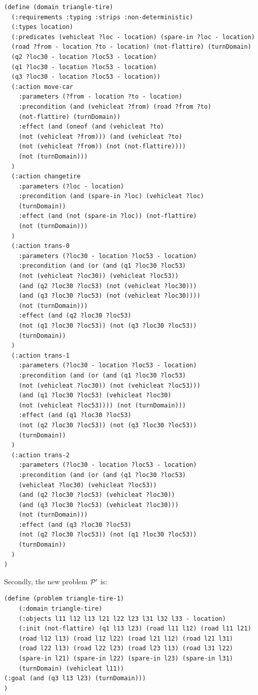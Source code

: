\begin{lstlisting}[language=PDDL, escapechar=£]
(define (domain triangle-tire)
  (:requirements :typing :strips :non-deterministic)
  (:types location)
  (:predicates (vehicleat ?loc - location) (spare-in ?loc - location) 
  (road ?from - location ?to - location) (not-flattire) (turnDomain) 
  (q2 ?loc30 - location ?loc53 - location) 
  (q1 ?loc30 - location ?loc53 - location) 
  (q3 ?loc30 - location ?loc53 - location))
  (:action move-car
    :parameters (?from - location ?to - location)
    :precondition (and (vehicleat ?from) (road ?from ?to) 
    (not-flattire) (turnDomain))
    :effect (and (oneof (and (vehicleat ?to) 
    (not (vehicleat ?from))) (and (vehicleat ?to) 
    (not (vehicleat ?from)) (not (not-flattire)))) 
    (not (turnDomain)))
  )
  (:action changetire
    :parameters (?loc - location)
    :precondition (and (spare-in ?loc) (vehicleat ?loc) 
    (turnDomain))
    :effect (and (not (spare-in ?loc)) (not-flattire) 
    (not (turnDomain)))
  )
  (:action trans-0
    :parameters (?loc30 - location ?loc53 - location)
    :precondition (and (or (and (q1 ?loc30 ?loc53) 
    (not (vehicleat ?loc30)) (vehicleat ?loc53)) 
    (and (q2 ?loc30 ?loc53) (not (vehicleat ?loc30))) 
    (and (q3 ?loc30 ?loc53) (not (vehicleat ?loc30)))) 
    (not (turnDomain)))
    :effect (and (q2 ?loc30 ?loc53) 
    (not (q1 ?loc30 ?loc53)) (not (q3 ?loc30 ?loc53)) 
    (turnDomain))
  )
  (:action trans-1
    :parameters (?loc30 - location ?loc53 - location)
    :precondition (and (or (and (q1 ?loc30 ?loc53) 
    (not (vehicleat ?loc30)) (not (vehicleat ?loc53))) 
    (and (q1 ?loc30 ?loc53) (vehicleat ?loc30) 
    (not (vehicleat ?loc53)))) (not (turnDomain)))
    :effect (and (q1 ?loc30 ?loc53) 
    (not (q2 ?loc30 ?loc53)) (not (q3 ?loc30 ?loc53)) 
    (turnDomain))
  )
  (:action trans-2
    :parameters (?loc30 - location ?loc53 - location)
    :precondition (and (or (and (q1 ?loc30 ?loc53) 
    (vehicleat ?loc30) (vehicleat ?loc53)) 
    (and (q2 ?loc30 ?loc53) (vehicleat ?loc30)) 
    (and (q3 ?loc30 ?loc53) (vehicleat ?loc30))) 
    (not (turnDomain)))
    :effect (and (q3 ?loc30 ?loc53) 
    (not (q2 ?loc30 ?loc53)) (not (q1 ?loc30 ?loc53)) 
    (turnDomain))
  )
)
\end{lstlisting}

Secondly, the new problem $\P'$ is:
\begin{lstlisting}[language=PDDL, escapechar=£]
(define (problem triangle-tire-1)
	(:domain triangle-tire)
	(:objects l11 l12 l13 l21 l22 l23 l31 l32 l33 - location)
	(:init (not-flattire) (q1 l13 l23) (road l11 l12) (road l11 l21) 
	(road l12 l13) (road l12 l22) (road l21 l12) (road l21 l31) 
	(road l22 l13) (road l22 l23) (road l23 l13) (road l31 l22) 
	(spare-in l21) (spare-in l22) (spare-in l23) (spare-in l31)
	(turnDomain) (vehicleat l11))
(:goal (and (q3 l13 l23) (turnDomain)))
)
\end{lstlisting}

